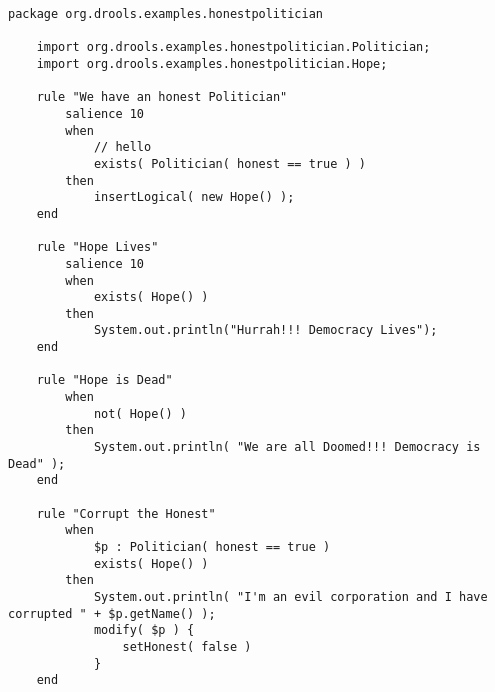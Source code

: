 \begin{lstlisting}[language={[drl]Drools}, caption=Example Drools file., captionpos=b, label=listing:drl_file]
    package org.drools.examples.honestpolitician
 
    import org.drools.examples.honestpolitician.Politician;
    import org.drools.examples.honestpolitician.Hope;
     
    rule "We have an honest Politician"
        salience 10
        when
            // hello
            exists( Politician( honest == true ) )
        then
            insertLogical( new Hope() );
    end
    
    rule "Hope Lives"
        salience 10
        when
            exists( Hope() )
        then
            System.out.println("Hurrah!!! Democracy Lives");
    end
    
    rule "Hope is Dead"
        when
            not( Hope() )
        then
            System.out.println( "We are all Doomed!!! Democracy is Dead" );
    end
    
    rule "Corrupt the Honest"
        when
            $p : Politician( honest == true )   
            exists( Hope() )
        then
            System.out.println( "I'm an evil corporation and I have corrupted " + $p.getName() );
            modify( $p ) { 
                setHonest( false ) 
            }
    end
\end{lstlisting}

